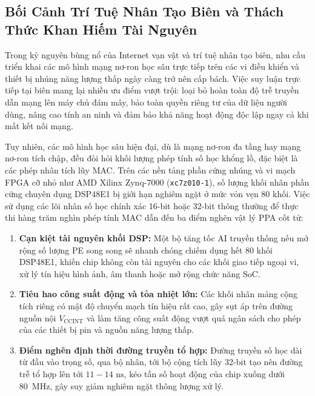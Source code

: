 \documentclass[conference]{IEEEtran}
\begin{document}
\subsection{Bối Cảnh Trí Tuệ Nhân Tạo Biên và Thách Thức Khan Hiếm Tài Nguyên}
\hspace*{1em} Trong kỷ nguyên bùng nổ của Internet vạn vật và trí tuệ nhân tạo biên, nhu cầu triển khai các mô hình mạng nơ-ron học sâu trực tiếp trên các vi điều khiển và thiết bị nhúng năng lượng thấp ngày càng trở nên cấp bách. Việc suy luận trực tiếp tại biên mang lại nhiều ưu điểm vượt trội: loại bỏ hoàn toàn độ trễ truyền dẫn mạng lên máy chủ đám mây, bảo toàn quyền riêng tư của dữ liệu người dùng, nâng cao tính an ninh và đảm bảo khả năng hoạt động độc lập ngay cả khi mất kết nối mạng.

Tuy nhiên, các mô hình học sâu hiện đại, dù là mạng nơ-ron đa tầng hay mạng nơ-ron tích chập, đều đòi hỏi khối lượng phép tính số học khổng lồ, đặc biệt là các phép nhân tích lũy MAC. Trên các nền tảng phần cứng nhúng và vi mạch FPGA cỡ nhỏ như AMD Xilinx Zynq-7000 (\texttt{xc7z010-1}), số lượng khối nhân phần cứng chuyên dụng DSP48E1 bị giới hạn nghiêm ngặt ở mức vỏn vẹn 80 khối. Việc sử dụng các lõi nhân số học chính xác 16-bit hoặc 32-bit thông thường để thực thi hàng trăm nghìn phép tính MAC dẫn đến ba điểm nghẽn vật lý PPA cốt tử:
\begin{enumerate}
    \item \textbf{Cạn kiệt tài nguyên khối DSP:} Một bộ tăng tốc AI truyền thống nếu mở rộng số lượng PE song song sẽ nhanh chóng chiếm dụng hết 80 khối DSP48E1, khiến chip không còn tài nguyên cho các khối giao tiếp ngoại vi, xử lý tín hiệu hình ảnh, âm thanh hoặc mở rộng chức năng SoC.
    \item \textbf{Tiêu hao công suất động và tỏa nhiệt lớn:} Các khối nhân mảng cộng tích riêng có mật độ chuyển mạch tín hiệu rất cao, gây sụt áp trên đường nguồn nội $V_{\text{CCINT}}$ và làm tăng công suất động vượt quá ngân sách cho phép của các thiết bị pin và nguồn năng lượng thấp.
    \item \textbf{Điểm nghẽn định thời đường truyền tổ hợp:} Đường truyền số học dài từ đầu vào trọng số, qua bộ nhân, tới bộ cộng tích lũy 32-bit tạo nên đường trễ tổ hợp lên tới $11 - 14\text{ ns}$, kéo tần số hoạt động của chip xuống dưới 80~MHz, gây suy giảm nghiêm ngặt thông lượng xử lý.
\end{enumerate}
\end{document}
